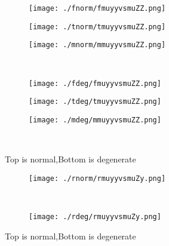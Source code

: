 \documentclass[aps,floats,floatfix,nofootinbib]{revtex4-1}
\begin{document}
\begin{center}
\begin{figure}
\begin{subfigure}{0.3\textwidth}
\texttt{[image: ./fnorm/fmuyyvsmuZZ.png]}
\label{}
\end{subfigure}
\begin{subfigure}{0.3\textwidth}
\texttt{[image: ./tnorm/tmuyyvsmuZZ.png]}
\label{}
\end{subfigure}
\begin{subfigure}{0.3\textwidth}
\texttt{[image: ./mnorm/mmuyyvsmuZZ.png]}
\label{}
\end{subfigure}\\
\begin{subfigure}{0.3\textwidth}
\texttt{[image: ./fdeg/fmuyyvsmuZZ.png]}
\label{}
\end{subfigure}
\begin{subfigure}{0.3\textwidth}
\texttt{[image: ./tdeg/tmuyyvsmuZZ.png]}
\label{}
\end{subfigure}
\begin{subfigure}{0.3\textwidth}
\texttt{[image: ./mdeg/mmuyyvsmuZZ.png]}
\label{}
\end{subfigure}\\
\caption{Top is normal,Bottom is degenerate}
\end{figure}
\end{center}

\begin{center}
\begin{figure}
\begin{subfigure}{0.95\textwidth}
\texttt{[image: ./rnorm/rmuyyvsmuZy.png]}
\label{}
\end{subfigure}\\
\begin{subfigure}{0.95\textwidth}
\texttt{[image: ./rdeg/rmuyyvsmuZy.png]}
\label{}
\end{subfigure}
\caption{Top is normal,Bottom is degenerate}
\end{figure}
\end{center}
\end{document}
